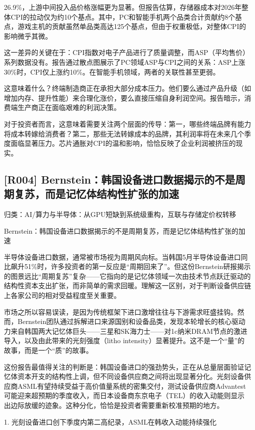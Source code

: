 \documentclass[11pt]{ctexart}
\begin{document}
26.9\%，上游中间投入品价格涨幅更为显著。但报告估算，存储器成本对2026年整体CPI的拉动仅为约10个基点。其中，PC和智能手机两个品类合计贡献约8个基点，游戏主机的贡献虽然单品类高达125个基点，但由于权重极低，对整体CPI的影响微乎其微。

这一差异的关键在于：CPI指数对电子产品进行了质量调整，而ASP（平均售价）系列数据没有。报告通过散点图展示了PC领域ASP与CPI之间的关系：ASP上涨30\%时，CPI仅上涨约10\%。在智能手机领域，两者的关联性甚至更弱。

这意味着什么？终端制造商正在承担大部分成本压力。他们要么通过产品升级（如增加内存、提升性能）来合理化涨价，要么直接压缩自身利润空间。报告暗示，消费端生产商正在面临艰难的利润决策。

对于投资者而言，这意味着需要关注两个层面的传导：第一，哪些终端品牌有能力将成本转嫁给消费者？第二，那些无法转嫁成本的品牌，其利润率将在未来几个季度面临显著压力。芯片通胀对CPI的温和影响，恰恰反映了企业利润被挤压的现实。

\subsection{[R004] Bernstein：韩国设备进口数据揭示的不是周期复苏，而是记忆体结构性扩张的加速}
{\small\color{refgray}归类：AI/算力与半导体：从GPU短缺到系统级重构，互联与存储定价权转移}

Bernstein：韩国设备进口数据揭示的不是周期复苏，而是记忆体结构性扩张的加速

半导体设备进口数据，通常被市场视为周期风向标。当韩国5月半导体设备进口同比飙升51\%时，许多投资者的第一反应是“周期回来了”。但这份Bernstein研报揭示的图景远比“周期复苏”复杂——它指向的是记忆体领域一次由技术节点跃迁驱动的结构性资本支出扩张，而非简单的需求回暖。理解这一区别，对于判断设备供应链上各家公司的相对受益程度至关重要。

市场之所以容易误读，是因为传统框架下进口激增往往与下游需求旺盛挂钩。然而，Bernstein团队通过拆解进口来源国别和设备品类，发现本轮增长的核心驱动力来自韩国两大记忆体巨头——三星和SK海力士——对1c纳米DRAM节点的激进导入，以及由此带来的光刻强度（litho intensity）显著提升。这不是一个“量”的故事，而是一个“质”的故事。

这份报告最值得关注的判断是：韩国设备进口的强劲势头，正在从总量层面验证记忆体资本开支的结构性上调，但不同设备供应商之间将出现显著分化。光刻设备供应商ASML有望持续受益于高价值量系统的密集交付，测试设备供应商Advantest可能迎来超预期的季度收入，而日本设备商东京电子（TEL）的收入动能则显示出边际放缓的迹象。这种分化，恰恰是投资者需要重新校准预期的地方。

1. 光刻设备进口创下季度内第二高纪录，ASML在韩收入动能持续强化
\end{document}
